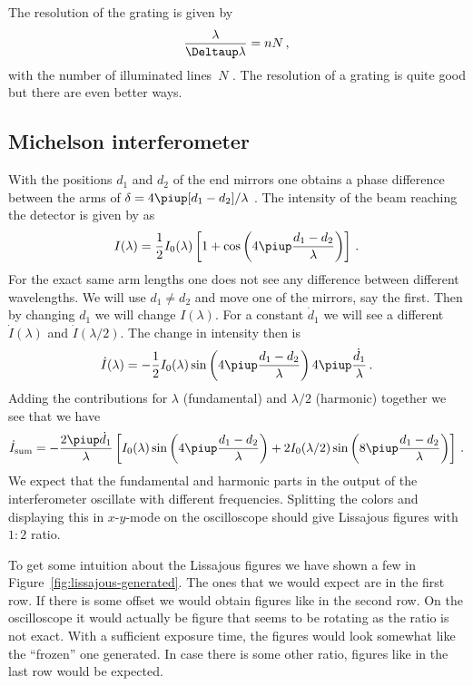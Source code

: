 \documentclass[11pt, english, fleqn, DIV=15, headinclude, BCOR=2cm]{scrreprt}
\begin{document}
The resolution of the grating is given by
\[
    \frac{\lambda}{\Deltaup \lambda} = n N \,,
\]
with the number of illuminated lines~$N$
\parencite{wikipedia/optisches_gitter}. The resolution of a grating is quite
good but there are even better ways.

\subsection{Michelson interferometer}



With the positions $d_1$ and $d_2$ of the end mirrors one obtains a phase
difference between the arms of $\delta = 4 \piup [d_1 - d_2] / \lambda$
\parencite[559]{meschede-gerthsen_24}. The intensity of the beam reaching the
detector is given by \textcite[559]{meschede-gerthsen_24} as
\begin{equation}
    \label{eq:I_of_lambda}
    I(\lambda) = \frac12 I_0(\lambda) \sbr{
        1 +
        \cos\del{4 \piup \frac{d_1 - d_2}{\lambda}}
    } \,.
\end{equation}
For the exact same arm lengths one does not see any difference between
different wavelengths. We will use $d_1 \neq d_2$ and move one of the mirrors,
say the first. Then by changing $d_1$ we will change $I(\lambda)$. For a
constant $\dot d_1$ we will see a different $\dot I(\lambda)$ and $\dot
I(\lambda/2)$. The change in intensity then is
\[
    \dot I(\lambda) = - \frac12 I_0(\lambda) 
        \sin\del{4 \piup \frac{d_1 - d_2}{\lambda}}
        4 \piup \frac{\dot d_1}{\lambda} \,.
\]
Adding the contributions for $\lambda$ (fundamental) and $\lambda/2$ (harmonic)
together we see that we have
\[
    \dot I_\text{sum}
    =
    - \frac{2 \piup \dot d_1}{\lambda}
    \sbr{
        I_0(\lambda) 
        \sin\del{4 \piup \frac{d_1 - d_2}{\lambda}}
        +
        2 I_0(\lambda/2) 
        \sin\del{8 \piup \frac{d_1 - d_2}{\lambda}}
    } \,.
\]
We expect that the fundamental and harmonic parts in the output of the
interferometer oscillate with different frequencies. Splitting the colors and
displaying this in $x$-$y$-mode on the oscilloscope should give Lissajous
figures with $1:2$ ratio.

To get some intuition about the Lissajous figures we have shown a few in
Figure~\ref{fig:lissajous-generated}. The ones that we would expect are in the
first row. If there is some offset we would obtain figures like in the second
row. On the oscilloscope it would actually be figure that seems to be rotating
as the ratio is not exact. With a sufficient exposure time, the figures would
look somewhat like the \enquote{frozen} one generated. In case there is some
other ratio, figures like in the last row would be expected.
\end{document}
